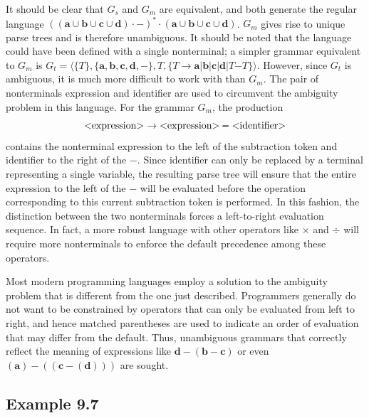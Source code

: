It should be clear that $G_s$ and $G_m$ are equivalent, and both generate the
regular language $((\pmb{a}\cup\pmb{b}\cup\pmb{c}\cup\pmb{d})\cdot\pmb{-})^*
\cdot(\pmb{a}\cup\pmb{b}\cup\pmb{c}\cup\pmb{d})$. $G_m$ gives rise to unique
parse trees and is therefore unambiguous. It should be noted that the language
could have been defined with a single nonterminal; a simpler grammar equivalent
to $G_m$ is $G_t = \langle\{T\},\{\pmb{a},\pmb{b},\pmb{c},\pmb{d},\pmb{-}\},T,\{
T\rightarrow\pmb{a}|\pmb{b}|\pmb{c}|\pmb{d}|T \pmb{-} T\}\rangle$. However, since
$G_t$ is ambiguous, it is much more difficult to work with than $G_m$. The pair
of nonterminals \<expression\> and \<identifier\> are used to circumvent the
ambiguity problem in this language. For the grammar $G_m$, the production
\[ \text{\text{\textless}expression\text{\textgreater}}\rightarrow\text{\text{\textless}expression\text{\textgreater}}\pmb{-}\text{\text{\textless}identifier\text{\textgreater}}\]
contains the nonterminal \<expression\> to the left of the subtraction token and
\<identifier\> to the right of the $\pmb{-}$. Since \<identifier\> can only be
replaced by a terminal representing a single variable, the resulting parse tree
will ensure that the entire expression to the left of the $\pmb{-}$ will be
evaluated before the operation corresponding to this current subtraction token
is performed. In this fashion, the distinction between the two nonterminals
forces a left-to-right evaluation sequence. In fact, a more robust language with
other operators like $\times$ and $\div$ will require more nonterminals to
enforce the default precedence among these operators.

Most modern programming languages employ a solution to the ambiguity problem
that is different from the one just described. Programmers generally do not
want to be constrained by operators that can only be evaluated from left to
right, and hence matched parentheses are used to indicate an order of evaluation
that may differ from the default. Thus, unambiguous grammars that correctly
reflect the meaning of expressions like $\pmb{d-(b-c)}$ or even $\pmb{(a)-((c-(d)))}$ are
sought.

\subsection*{Example 9.7}


